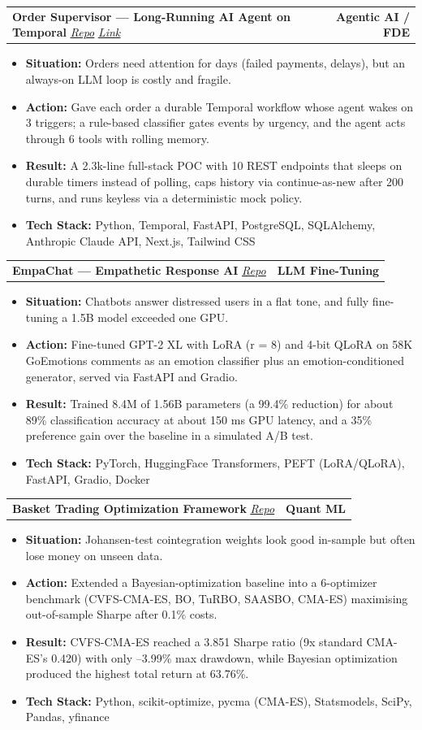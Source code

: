 \documentclass[letterpaper,11pt]{article}
\newcommand{\resumeItem}[1]{
  \item\small{
    {#1 \vspace{-2pt}}
  }
}
\newcommand{\resumeProjectHeadingWithRepo}[3]{
    \item
    \begin{tabular*}{1.0\textwidth}{p{0.78\textwidth} r}
      \small#1 \textit{\uline{\href{#2}{Repo}}} & \textbf{\small #3}\\
    \end{tabular*}\vspace{-4pt}
}
\newcommand{\resumeProjectHeadingWithBoth}[4]{
    \item
    \begin{tabular*}{1.0\textwidth}{p{0.78\textwidth} r}
      \small#1 \textit{\uline{\href{#2}{Repo}}} \textit{\uline{\href{#3}{Link}}} & \textbf{\small #4}\\
    \end{tabular*}\vspace{-4pt}
}
\newcommand{\resumeItemListStart}{\begin{itemize}[leftmargin=0.2in, itemsep=0pt]}
\newcommand{\resumeItemListEnd}{\end{itemize}\vspace{-5pt}}
\begin{document}
\resumeProjectHeadingWithBoth
    {\textbf{Order Supervisor --- Long-Running AI Agent on Temporal}}
    {https://github.com/sayantansikdar/order-supervisor}{https://sayantansikdar.github.io/order-supervisor/}{Agentic AI / FDE}
\resumeItemListStart
    \resumeItem{\textbf{Situation:} Orders need attention for days (failed payments, delays), but an always-on LLM loop is costly and fragile.}
    \resumeItem{\textbf{Action:} Gave each order a durable Temporal workflow whose agent wakes on 3 triggers; a rule-based classifier gates events by urgency, and the agent acts through 6 tools with rolling memory.}
    \resumeItem{\textbf{Result:} A 2.3k-line full-stack POC with 10 REST endpoints that sleeps on durable timers instead of polling, caps history via continue-as-new after 200 turns, and runs keyless via a deterministic mock policy.}
    \resumeItem{\textbf{Tech Stack:} Python, Temporal, FastAPI, PostgreSQL, SQLAlchemy, Anthropic Claude API, Next.js, Tailwind CSS}
\resumeItemListEnd
\vspace{-4pt}

\resumeProjectHeadingWithRepo
    {\textbf{EmpaChat --- Empathetic Response AI}}
    {https://github.com/sayantansikdar/empathetic-ai}{LLM Fine-Tuning}
\resumeItemListStart
    \resumeItem{\textbf{Situation:} Chatbots answer distressed users in a flat tone, and fully fine-tuning a 1.5B model exceeded one GPU.}
    \resumeItem{\textbf{Action:} Fine-tuned GPT-2 XL with LoRA (r = 8) and 4-bit QLoRA on 58K GoEmotions comments as an emotion classifier plus an emotion-conditioned generator, served via FastAPI and Gradio.}
    \resumeItem{\textbf{Result:} Trained 8.4M of 1.56B parameters (a 99.4\% reduction) for about 89\% classification accuracy at about 150 ms GPU latency, and a 35\% preference gain over the baseline in a simulated A/B test.}
    \resumeItem{\textbf{Tech Stack:} PyTorch, HuggingFace Transformers, PEFT (LoRA/QLoRA), FastAPI, Gradio, Docker}
\resumeItemListEnd
\vspace{-4pt}

\resumeProjectHeadingWithRepo
    {\textbf{Basket Trading Optimization Framework}}
    {https://github.com/sayantansikdar/Advanced-Basket-Trading-Optimization-Framework}{Quant ML}
\resumeItemListStart
    \resumeItem{\textbf{Situation:} Johansen-test cointegration weights look good in-sample but often lose money on unseen data.}
    \resumeItem{\textbf{Action:} Extended a Bayesian-optimization baseline into a 6-optimizer benchmark (CVFS-CMA-ES, BO, TuRBO, SAASBO, CMA-ES) maximising out-of-sample Sharpe after 0.1\% costs.}
    \resumeItem{\textbf{Result:} CVFS-CMA-ES reached a 3.851 Sharpe ratio (9x standard CMA-ES's 0.420) with only --3.99\% max drawdown, while Bayesian optimization produced the highest total return at 63.76\%.}
    \resumeItem{\textbf{Tech Stack:} Python, scikit-optimize, pycma (CMA-ES), Statsmodels, SciPy, Pandas, yfinance}
\resumeItemListEnd
\vspace{-4pt}
\end{document}
